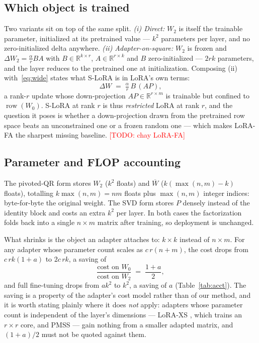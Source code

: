 \documentclass{article}
\theoremstyle{remark}
\newcommand{\TODO}[1]{\textcolor{red}{[TODO: #1]}}
\begin{document}
\subsection{Which object is trained}
Two variants sit on top of the same split. \emph{(i) Direct:} $W_2$ is itself
the trainable parameter, initialized at its pretrained value --- $k^2$
parameters per layer, and no zero-initialized delta anywhere.
\emph{(ii) Adapter-on-square:} $W_2$ is frozen and
$\Delta W_2=\tfrac{\alpha}{r}BA$ with $B\in\mathbb{R}^{k\times r}$,
$A\in\mathbb{R}^{r\times k}$ and $B$ zero-initialized --- $2rk$ parameters, and
the layer reduces to the pretrained one at initialization. Composing (ii)
with~\eqref{eq:wide} states what S-LoRA is in LoRA's own terms:
\begin{equation}
  \Delta W \;=\; \tfrac{\alpha}{r}\,B\,(A P),
  \label{eq:restricted-lora}
\end{equation}
a rank-$r$ update whose down-projection $AP\in\mathbb{R}^{r\times m}$ is
trainable but confined to $\operatorname{row}(W_0)$. S-LoRA at rank $r$ is thus
\emph{restricted} LoRA at rank $r$, and the question it poses is whether a
down-projection drawn from the pretrained row space beats an unconstrained one
or a frozen random one --- which makes LoRA-FA \citep{zhang2023lorafa} the
sharpest missing baseline. \TODO{chay LoRA-FA}

\subsection{Parameter and FLOP accounting}
\label{sec:acct}
The pivoted-QR form stores $W_2$ ($k^2$ floats) and $\overline{W}$
($k(\max(n,m)-k)$ floats), totalling $k\max(n,m)=nm$ floats plus $\max(n,m)$
integer indices: byte-for-byte the original weight. The SVD form stores $P$
densely instead of the identity block and costs an extra $k^2$ per layer. In
both cases the factorization folds back into a single $n\times m$ matrix after
training, so deployment is unchanged.

What shrinks is the object an adapter attaches to: $k\times k$ instead of
$n\times m$. For any adapter whose parameter count scales as $c\,r(n+m)$, the
cost drops from $c\,rk(1+a)$ to $2c\,rk$, a saving of
\begin{equation}
  \frac{\text{cost on }W_0}{\text{cost on }W_2}\;=\;\frac{1+a}{2},
  \label{eq:saving}
\end{equation}
and full fine-tuning drops from $ak^2$ to $k^2$, a saving of $a$
(Table~\ref{tab:acct}). The saving is a property of the adapter's cost model
rather than of our method, and it is worth stating plainly where it does
\emph{not} apply: adapters whose parameter count is independent of the layer's
dimensions --- LoRA-XS \citep{balazy2024loraxs}, which trains an $r\times r$
core, and PMSS \citep{wang2025pmss} --- gain nothing from a smaller adapted
matrix, and $(1+a)/2$ must not be quoted against them.
\end{document}

